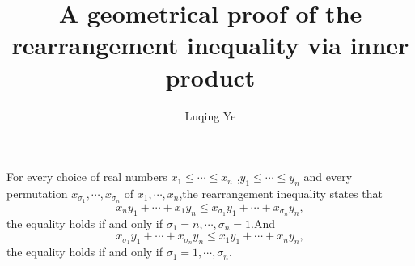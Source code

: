 \documentclass{amsart}
\theoremstyle{plain}
\theoremstyle{definition}
\begin{document}
\title{A geometrical proof of the rearrangement inequality via inner product}

\author{Luqing Ye}
\address{An undergrad at College of Science, Hangzhou Normal University,Hangzhou City,Zhejiang Province,China}
\maketitle
For every choice of real numbers $x_1\leq \cdots\leq x_n$ ,$y_1\leq
\cdots\leq y_n$ and every permutation
$x_{\sigma_{1}},\cdots,x_{\sigma_n}$ of $x_1,\cdots,x_n$,the rearrangement inequality states that
\begin{equation*}
  x_ny_1 + \cdots + x_1y_n
\le x_{\sigma_{1}}y_1 + \cdots + x_{\sigma_{n}}y_{n},
\end{equation*}
the equality holds if and only if
$\sigma_1=n,\cdots,\sigma_n=1$.And
\begin{equation*}
  x_{\sigma_{1}}y_1 + \cdots + x_{\sigma_{n}}y_{n}\leq x_1y_1+\cdots+x_ny_n,
\end{equation*}
the equality holds if and only if $\sigma_1=1,\cdots,\sigma_n$.

\setcounter{tocdepth}{2}
\end{document}
